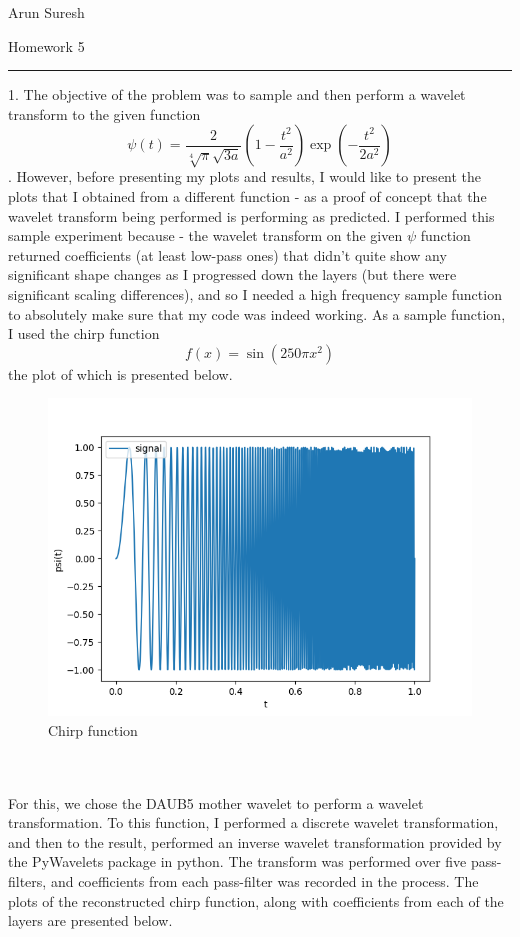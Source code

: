 \documentclass[12pt]{article}
\begin{document}
	\quad \quad \quad \quad \quad \quad \quad \quad \quad \quad  \quad \quad \quad \quad \quad \quad \quad \quad \quad \quad  \quad \quad \quad \quad \quad \quad \quad \quad \quad \quad  Arun Suresh
	\begin{center}
		Homework 5
	\end{center} 
	{\rule{\linewidth}{0.1mm} }

1. The objective of the problem was to sample and then perform a wavelet transform to the given function $$\psi(t) = \frac{2}{\sqrt[4]{\pi}\sqrt{3a}}(1-\frac{t^2}{a^2})\exp(-\frac{t^2}{2a^2})$$. 
However, before presenting my plots and results, I would like to present the plots that I obtained from a different function - as a proof of concept that the wavelet transform being performed is performing as predicted. I performed this sample experiment because - the wavelet transform on the given $\psi$ function returned coefficients (at least low-pass ones) that didn't quite show any significant shape changes as I progressed down the layers (but there were significant scaling differences), and so I needed a high frequency sample function to absolutely make sure that my code was indeed working. As a sample function, I used the chirp function $$f(x) = \sin(250\pi x^2)$$ the plot of which is presented below. \\
\begin{figure}[h]
	\centering
	\includegraphics[scale=0.40]{proofofconcept.png}
	\caption{Chirp function}
\end{figure}\\\\
For this, we chose the DAUB5 mother wavelet to perform a wavelet transformation. To this function, I performed a discrete wavelet transformation, and then to the result, performed an inverse wavelet transformation provided by the PyWavelets package in python. The transform was performed over five pass-filters, and coefficients from each pass-filter was recorded in the process. The plots of the reconstructed chirp function, along with coefficients from each of the layers are presented below. 
\end{document}
